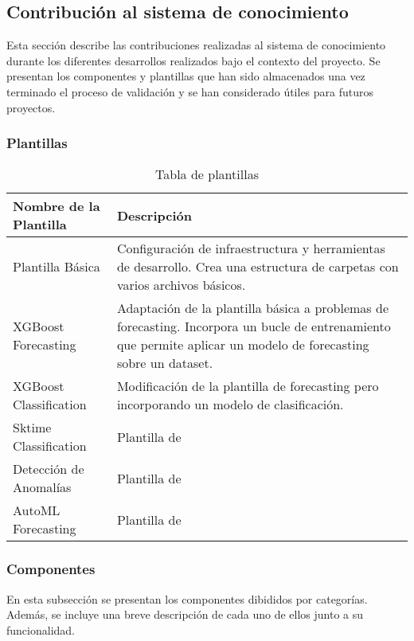 \subsection{Contribución al sistema de conocimiento}
Esta sección describe las contribuciones realizadas al sistema de conocimiento
durante los diferentes desarrollos realizados bajo el contexto del proyecto. 
Se presentan los componentes y plantillas que han sido almacenados una vez
terminado el proceso de validación y se han considerado útiles para futuros
proyectos.

\subsubsection{Plantillas}
\begin{table}[h!]
    \centering
    \begin{tabular}{| m{4cm} | m{8cm} |}
      \hline
      \textbf{Nombre de la Plantilla} & \textbf{Descripción} \\ 
      \hline
      Plantilla Básica & Configuración de infraestructura y herramientas de desarrollo.
      Crea una estructura de carpetas con varios archivos básicos. \\ 
      \hline
      XGBoost Forecasting & Adaptación de la plantilla básica a problemas de forecasting.
      Incorpora un bucle de entrenamiento que permite aplicar un modelo de forecasting sobre un dataset.\\ 
      \hline
      XGBoost Classification & Modificación de la plantilla de forecasting pero incorporando un modelo
      de clasificación.\\ 
      \hline
      Sktime Classification & Plantilla de  \\ 
      \hline
      Detección de Anomalías & Plantilla de \\ 
      \hline
      AutoML Forecasting & Plantilla de \\ 
      \hline
    \end{tabular}
    \caption{Tabla de plantillas}
    \label{table:templates}
\end{table}

\subsubsection{Componentes}
En esta subsección se presentan los componentes dibididos por categorías.
Además, se incluye una breve descripción de cada uno de ellos junto a su funcionalidad.

